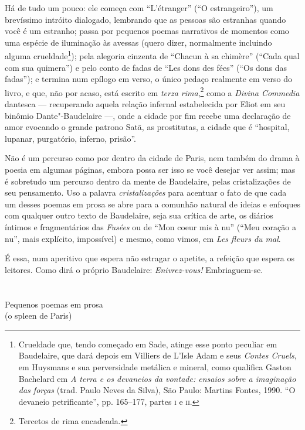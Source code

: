 Há de tudo um pouco: ele começa com “L’étranger” (“O estrangeiro”), um
brevíssimo intróito dialogado, lembrando que as pessoas são estranhas
quando você é um estranho; passa por pequenos poemas narrativos de
momentos como uma espécie de iluminação às avessas (quero dizer,
normalmente incluindo alguma crueldade\footnote{ Crueldade que, tendo
começado em Sade, atinge esse ponto peculiar em Baudelaire, que dará
depois em Villiers de L’Isle Adam e seus \textit{Contes Cruels}, em Huysmans e
sua perversidade metálica e mineral, como qualifica Gaston Bachelard em
\textit{A terra e os devaneios da vontade: ensaios sobre a imaginação das
forças} (trad. Paulo Neves da Silva), São Paulo: Martins Fontes,
1990. “O devaneio petrificante”, pp. 165--177, partes \textsc{i} e \textsc{ii}.}); pela
alegoria cinzenta de “Chacun à sa chimère” (“Cada qual com sua quimera”)
e pelo conto de fadas de “Les dons des fées” (“Os dons das fadas”); e
termina num epílogo em verso, o único pedaço realmente em verso do
livro, e que, não por acaso, está escrito em \textit{terza
rima},\footnote{ Tercetos de rima encadeada.} como a \textit{Divina
Commedia} dantesca --- recuperando aquela relação infernal estabelecida
por Eliot em seu binômio Dante"-Baudelaire ---, onde a cidade por fim
recebe uma declaração de amor evocando o grande patrono Satã, as
prostitutas, a cidade que é “hospital, lupanar, purgatório, inferno,
prisão”.

Não é um percurso como por dentro da cidade de Paris, nem também do
drama à poesia em algumas páginas, embora possa ser isso se você
desejar ver assim; mas é sobretudo um percurso dentro da mente de
Baudelaire, pelas cristalizações de seu pensamento. Uso a palavra
\textit{cristalizações} para acentuar o fato de que cada um desses
poemas em prosa se abre para a comunhão natural de ideias e enfoques
com qualquer outro texto de Baudelaire, seja sua crítica de arte, os
diários íntimos e fragmentários das \textit{Fusées} ou de “Mon
coeur mis à nu” (“Meu coração a nu”, mais explícito, impossível) e
mesmo, como vimos, em \textit{Les fleurs du mal}. 

É essa, num aperitivo que espera não estragar o apetite, a refeição que espera os leitores. Como dirá o próprio Baudelaire: \textit{Enivrez-vous!} Embriaguem-se.


\chapter*{}
\begin{center}
\begin{vplace}[0.3]
\Large
Pequenos poemas em prosa\\
(o spleen de Paris)
\end{vplace}
\end{center}
\thispagestyle{empty}